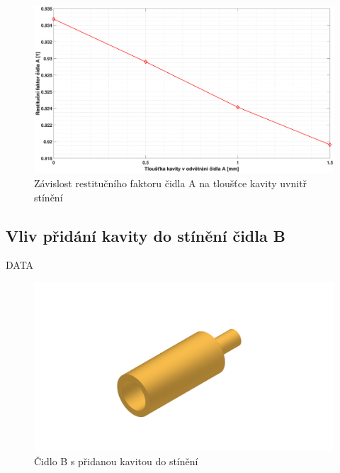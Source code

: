         \begin{figure}[ht!]
            \centering
            \includegraphics*[width=\textwidth, trim={5.25cm 1.0cm 5.8cm 2.0cm}]{400_SIMULACE_KONSTRUKCNICH_UPRAV/Grafy/kavita.eps}
            \caption{Závislost restitučního faktoru čidla A na tloušťce kavity uvnitř stínění}
            \label{fig:kavita-A-graf}
        \end{figure}
    
    \newpage
    
    \subsection{Vliv přidání kavity do stínění čidla B}
        DATA
        
        \begin{figure}[ht!]
            \centering
            \includegraphics[width=\textwidth]{400_SIMULACE_KONSTRUKCNICH_UPRAV/Vykresy_rendery/Kavita_B.png}
            \caption{Čidlo B s přidanou kavitou do stínění}
            \label{fig:kavita-B}
        \end{figure}
    
